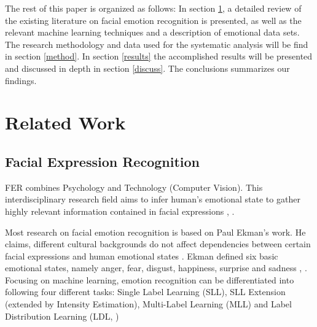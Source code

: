\documentclass[a4paper, conference]{IEEEtran}
\begin{document}

The rest of this paper is organized as follows: In section \ref{relwork}, a detailed review of the existing literature on facial emotion recognition is presented, as well as the relevant machine learning techniques and a description of emotional data sets. The research methodology and data used for the systematic analysis will be find in section \ref{method}. In section \ref{results} the accomplished results will be presented and discussed in depth in section \ref{discuss}. The conclusions summarizes our findings.


\section{Related Work}
\label{relwork}

\subsection{Facial Expression Recognition}
FER combines Psychology \cite{darwinExpressionEmotionsMan1872, ekmanConstantsCulturesFace1971} and Technology (Computer Vision). This interdisciplinary research field aims to infer human's emotional state to gather highly relevant information contained in facial expressions \cite{ekweaririFacialExpressionRecognition2017}, \cite{jaisonReviewFacialEmotion2021}. %

Most research on facial emotion recognition is based on Paul Ekman's work. He claims, different cultural backgrounds do not affect dependencies between certain facial expressions and human emotional states \cite{ekmanConstantsCulturesFace1971}. Ekman defined six basic emotional states, namely anger, fear, disgust, happiness, surprise and sadness \cite{darwinExpressionEmotionsMan1872}, \cite{ekmanBasicEmotionsHandbook1999}. Focusing on machine learning, emotion recognition can be differentiated into following four different tasks: Single Label Learning (SLL), SLL Extension (extended by Intensity Estimation), Multi-Label Learning (MLL) and Label Distribution Learning (LDL, \cite{ekundayoFacialExpressionRecognition2021})%
\end{document}
